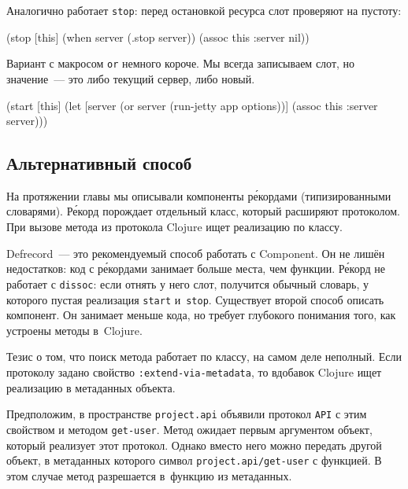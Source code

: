 \noindent
Аналогично работает \verb|stop|: перед остановкой ресурса слот проверяют на
пустоту:

\begin{english}
  \begin{clojure}
(stop [this]
  (when server
    (.stop server))
  (assoc this :server nil))
  \end{clojure}
\end{english}

Вариант с макросом \verb|or| немного короче. Мы всегда записываем слот, но
значение~--- это либо текущий сервер, либо новый.

\begin{english}
  \begin{clojure}
(start [this]
  (let [server (or server (run-jetty app options))]
    (assoc this :server server)))
  \end{clojure}
\end{english}

\subsection{Альтернативный способ}

На протяжении главы мы описывали компоненты р\'{е}кордами (типизированными
словарями). Р\'{е}корд порождает отдельный класс, который расширяют
протоколом. При вызове метода из протокола Clojure ищет реализацию по классу.


Defrecord~--- это рекомендуемый способ работать с Component. Он не лишён
недостатков: код с р\'{е}кордами занимает больше места, чем функции. Р\'{е}корд не
работает с \verb|dissoc|: если отнять у него слот, получится обычный словарь, у
которого пустая реализация \verb|start| и~\verb|stop|. Существует второй способ
описать компонент. Он занимает меньше кода, но требует глубокого понимания того,
как устроены методы в~Clojure.

Тезис о том, что поиск метода работает по классу, на самом деле неполный. Если
протоколу задано свойство \verb|:extend-via-metadata|, то вдобавок Clojure ищет
реализацию в метаданных объекта.

Предположим, в пространстве \verb|project.api| объявили протокол \verb|API| с
этим свойством и методом \verb|get-user|. Метод ожидает первым аргументом
объект, который реализует этот протокол. Однако вместо него можно передать
другой объект, в метаданных которого символ \verb|project.api/get-user| с
функцией. В этом случае метод разрешается в~функцию из метаданных.

